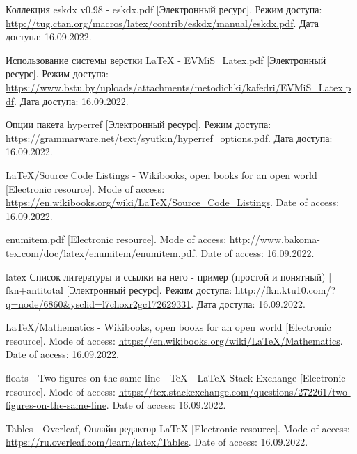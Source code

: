   \begin{thebibliography}{}
    Коллекция eskdx v0.98 - eskdx.pdf
    [Электронный ресурс].
    Режим доступа: \url{http://tug.ctan.org/macros/latex/contrib/eskdx/manual/eskdx.pdf}.
    Дата доступа: 16.09.2022.
  
    Использование системы верстки LaTeX - EVMiS\_Latex.pdf
    [Электронный ресурс].
    Режим доступа: \url{https://www.bstu.by/uploads/attachments/metodichki/kafedri/EVMiS_Latex.pdf}.
    Дата доступа: 16.09.2022.
  
    Опции пакета hyperref
    [Электронный ресурс].
    Режим доступа: \url{https://grammarware.net/text/syutkin/hyperref_options.pdf}.
    Дата доступа: 16.09.2022.
  
    LaTeX/Source Code Listings - Wikibooks, open books for an open world
    [Electronic resource].
    Mode of access: \url{https://en.wikibooks.org/wiki/LaTeX/Source_Code_Listings}.
    Date of access: 16.09.2022.
  
    enumitem.pdf
    [Electronic resource].
    Mode of access: \url{http://www.bakoma-tex.com/doc/latex/enumitem/enumitem.pdf}.
    Date of access: 16.09.2022.
  
    latex Список литературы и ссылки на него - пример (простой и понятный) | fkn+antitotal
    [Электронный ресурс].
    Режим доступа: \url{http://fkn.ktu10.com/?q=node/6860&ysclid=l7choxr2gc172629331}.
    Дата доступа: 16.09.2022.

    LaTeX/Mathematics - Wikibooks, open books for an open world
    [Electronic resource].
    Mode of access: \url{https://en.wikibooks.org/wiki/LaTeX/Mathematics}.
    Date of access: 16.09.2022.

    floats - Two figures on the same line - TeX - LaTeX Stack Exchange
    [Electronic resource].
    Mode of access: \url{https://tex.stackexchange.com/questions/272261/two-figures-on-the-same-line}.
    Date of access: 16.09.2022.

    Tables - Overleaf, Онлайн редактор LaTeX
    [Electronic resource].
    Mode of access: \url{https://ru.overleaf.com/learn/latex/Tables}.
    Date of access: 16.09.2022.    
  \end{thebibliography}
\endgroup

\newpage

